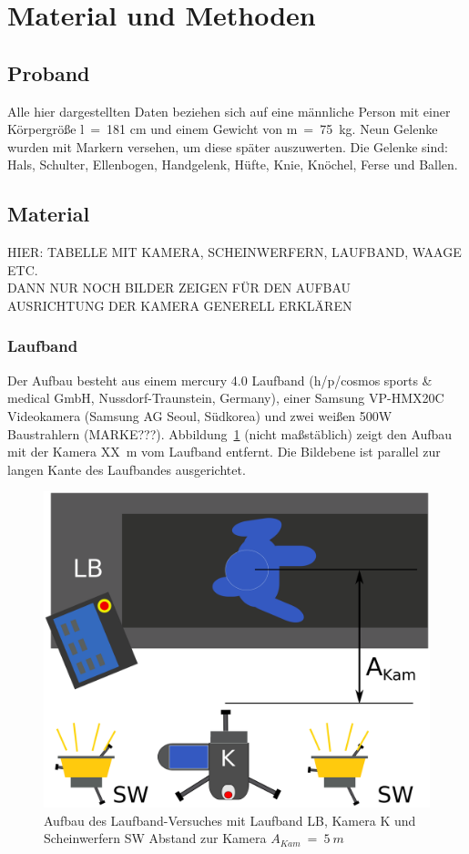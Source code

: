 \section{Material und Methoden}

\subsection{Proband}
Alle hier dargestellten Daten beziehen sich auf eine männliche Person mit einer Körpergröße l~=~181 cm und einem Gewicht von m~=~75~kg. Neun Gelenke wurden mit Markern versehen, um diese später auszuwerten. Die Gelenke sind: Hals, Schulter, Ellenbogen, Handgelenk, Hüfte, Knie, Knöchel, Ferse und Ballen.

\subsection{Material}
HIER: TABELLE MIT KAMERA, SCHEINWERFERN, LAUFBAND, WAAGE ETC.\\
DANN NUR NOCH BILDER ZEIGEN FÜR DEN AUFBAU\\
AUSRICHTUNG DER KAMERA GENERELL ERKLÄREN
\subsubsection{Laufband}
Der Aufbau besteht aus einem mercury 4.0 Laufband (h/p/cosmos sports \& medical GmbH, Nussdorf-Traunstein, Germany), einer Samsung VP-HMX20C Videokamera (Samsung AG Seoul, Südkorea) und zwei weißen 500W Baustrahlern (MARKE???). Abbildung~\ref{fig:laufbnd_stp} (nicht maßstäblich) zeigt den Aufbau mit der Kamera XX~m vom Laufband entfernt. Die Bildebene ist parallel zur langen Kante des Laufbandes ausgerichtet.

\begin{figure}[h!]
	\centering
	\includegraphics[width=0.5\linewidth]{bilder/mat_met/Laufband_setup}
	\caption[Aufbau Laufband Versuch]{Aufbau des Laufband-Versuches mit Laufband LB, Kamera K und Scheinwerfern SW Abstand zur Kamera $A_{Kam}~=~5~m$ }
	\label{fig:laufbnd_stp}
\end{figure}

